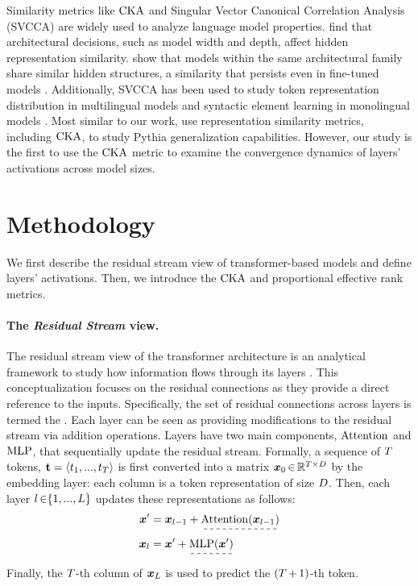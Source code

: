 Similarity metrics like $\mathrm{CKA}$ and Singular Vector Canonical Correlation Analysis (SVCCA) are widely used to analyze language model properties. \citet{nguyen2020wide} find that architectural decisions, such as model width and depth, affect hidden representation similarity. \citet{wu2020similarity} show that models within the same architectural family share similar hidden structures, a similarity that persists even in fine-tuned models \citep{phang2021fine}. Additionally, SVCCA has been used to study token representation distribution in multilingual models \citep{singh2019bert} and syntactic element learning in monolingual models \citep{saphra2019understanding}.
Most similar to our work, \citet{brown2023understanding} use representation similarity metrics, including $\mathrm{CKA}$, to study Pythia generalization capabilities. However, our study is the first to use the $\mathrm{CKA}$ metric to examine the convergence dynamics of layers' activations across model sizes.


\section{Methodology}\label{sec:methodology}

We first describe the residual stream view of transformer-based models and define layers' activations. Then, we introduce the $\mathrm{CKA}$ and proportional effective rank metrics.

\paragraph{The \textit{Residual Stream} view.}
The residual stream view of the transformer architecture \citep{vaswani2017attention} is an analytical framework to study how information flows through its layers \citep{elhage2021mathematical}. 
This conceptualization focuses on the residual connections as they provide a direct reference to the inputs. Specifically, the set of residual connections across layers is termed the . Each layer can be seen as providing modifications to the residual stream via addition operations.
Layers have two main components, $\mathrm{Attention}$ and $\mathrm{MLP}$, that sequentially update the residual stream. Formally, a sequence of $T$ tokens, $\boldsymbol{\mathrm{t}} = \langle t_1, ..., t_T\rangle$ is first converted into a matrix $\boldsymbol{x}_0 \mathop{\in} \mathbb{R}^{\mathop{T\times D}}$ by the embedding layer: each column is a token representation of size $D$. Then, each layer $l\mathop{\in}\{1,..., L\}$ updates these representations as follows:
\begin{align}\label{eq:residual_stream}
    \xdata' &= \xdata_{\layer-1}  + \dashuline{\attention(\xdata_{\layer-1})} \\
    \xdata_\layer &= \xdata' + \dashuline{\mlp(\xdata')}
\end{align}
Finally, the $T$-th column of $\boldsymbol{x}_L$ is used to predict the $(T\mathop{+}1)$-th token. 

